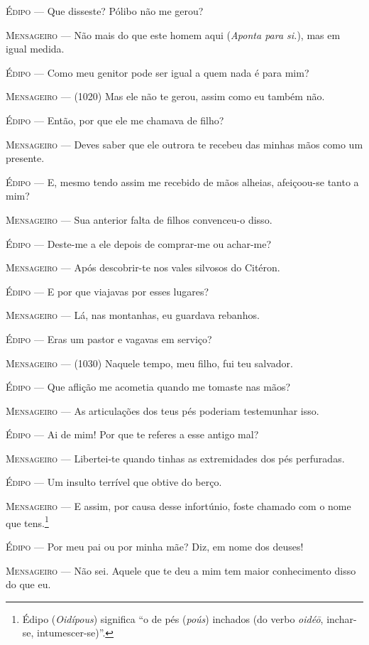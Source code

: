 \textsc{Édipo} --- Que disseste? Pólibo não me gerou?

\textsc{Mensageiro} --- Não mais do que este homem aqui (\emph{Aponta para si.}), mas em igual
medida.

\textsc{Édipo} --- Como meu genitor pode ser igual a quem nada é para mim?

\textsc{Mensageiro} --- (1020) Mas ele não te gerou, assim como eu também não.

\textsc{Édipo} --- Então, por que ele me chamava de filho?

\textsc{Mensageiro} --- Deves saber que ele outrora te recebeu das minhas mãos como um presente.

\textsc{Édipo} --- E, mesmo tendo assim me recebido de mãos alheias, afeiçoou-se tanto a
mim?

\textsc{Mensageiro} --- Sua anterior falta de filhos convenceu-o disso.

\textsc{Édipo} --- Deste-me a ele depois de comprar-me ou achar-me?

\textsc{Mensageiro} --- Após descobrir-te nos vales silvosos do Citéron.

\textsc{Édipo} --- E por que viajavas por esses lugares?

\textsc{Mensageiro} --- Lá, nas montanhas, eu guardava rebanhos.

\textsc{Édipo} --- Eras um pastor e vagavas em serviço?

\textsc{Mensageiro} --- (1030) Naquele tempo, meu filho, fui teu salvador.

\textsc{Édipo} --- Que aflição me acometia quando me tomaste nas mãos?

\textsc{Mensageiro} --- As articulações dos teus pés poderiam testemunhar isso.

\textsc{Édipo} --- Ai de mim! Por que te referes a esse antigo mal?

\textsc{Mensageiro} --- Libertei-te quando tinhas as extremidades dos pés perfuradas.

\textsc{Édipo} --- Um insulto terrível que obtive do berço.

\textsc{Mensageiro} --- E assim, por causa desse infortúnio, foste chamado com o nome que
tens.\footnote{Édipo (\emph{Oidípous}) significa ``o de pés (\emph{poús})
  inchados (do verbo \emph{oidéō}, inchar-se, intumescer-se)''.}

\textsc{Édipo} --- Por meu pai ou por minha mãe? Diz, em nome dos deuses!

\textsc{Mensageiro} --- Não sei. Aquele que te deu a mim tem maior conhecimento disso do que eu.

